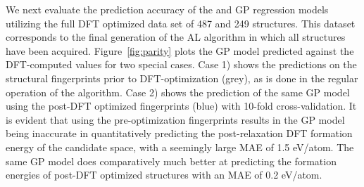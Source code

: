 We next evaluate the prediction accuracy of the \IrOtwo and \IrOthree GP regression models utilizing the full DFT optimized data set of 487 \IrOtwo and 249 \IrOthree structures.
%
This dataset corresponds to the final generation of the AL algorithm in which all structures have been acquired.
%
Figure~\ref{fig:parity} plots the GP model predicted \DHf against the DFT-computed values for two special cases.
%
Case 1) shows the predictions on the structural fingerprints prior to DFT-optimization (grey), as is done in the regular operation of the algorithm.
%
Case 2) shows the prediction of the same GP model using the post-DFT optimized fingerprints (blue) with \num{10}-fold cross-validation.
%
It is evident that using the pre-optimization fingerprints results in the GP model being inaccurate in quantitatively predicting the post-relaxation DFT formation energy of the candidate space,
with a seemingly large MAE of \mytilde\num{1.5} eV/atom.
%
The same GP model does comparatively much better at predicting the formation energies of post-DFT optimized structures with an MAE of \mytilde\num{0.2} eV/atom.


